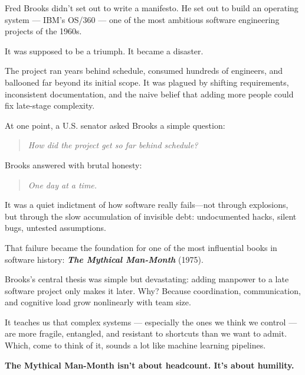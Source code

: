 \begin{tcolorbox}[title=Historical Sidebar: “One Day at a Time” — How Software Became Self-Aware, colback=gray!5!white, colframe=black!80!white, breakable, fonttitle=\bfseries]

    Fred Brooks didn’t set out to write a manifesto.  He set out to build an operating system — IBM’s OS/360 — one of the most ambitious software engineering projects of the 1960s.

    \medskip
    
    It was supposed to be a triumph. It became a disaster.

    \medskip
    
    The project ran years behind schedule, consumed hundreds of engineers, and ballooned far beyond its initial scope. It was plagued by shifting requirements, inconsistent documentation, and the naive belief that adding more people could fix late-stage complexity.

    \medskip
    
    At one point, a U.S. senator asked Brooks a simple question:
    
    \begin{quote}
    \textit{How did the project get so far behind schedule?}
    \end{quote}
    
    Brooks answered with brutal honesty:
    
    \begin{quote}
    \textit{One day at a time.}
    \end{quote}
    
    It was a quiet indictment of how software really fails—not through explosions, but through the slow accumulation of invisible debt: undocumented hacks, silent bugs, untested assumptions.

    \medskip
    
    That failure became the foundation for one of the most influential books in software history:  \textbf{\textit{The Mythical Man-Month}} (1975).

    \medskip
    
    Brooks’s central thesis was simple but devastating:  adding manpower to a late software project only makes it later.  Why? Because coordination, communication, and cognitive load grow nonlinearly with team size.

    \medskip
    
    It teaches us that complex systems — especially the ones we think we control — are more fragile, entangled, and resistant to shortcuts than we want to admit.  Which, come to think of it, sounds a lot like machine learning pipelines.

    \medskip
    
    \textbf{The Mythical Man-Month isn’t about headcount. It’s about humility.}
    
\end{tcolorbox}




